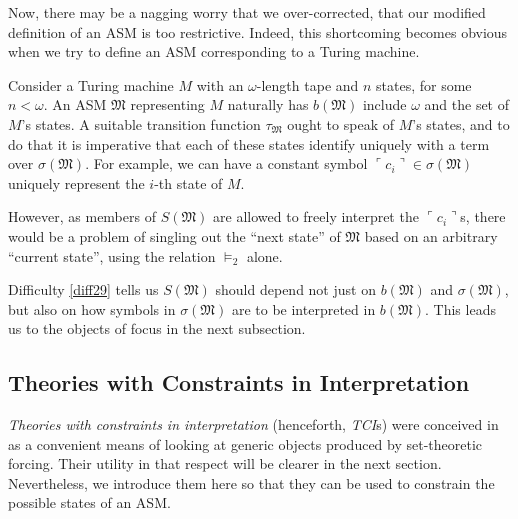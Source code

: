 \documentclass[12pt]{article}
\numberwithin{equation}{section}
\begin{document}
Now, there may be a nagging worry that we over-corrected, that our modified definition of an ASM is too restrictive. Indeed, this shortcoming becomes obvious when we try to define an ASM corresponding to a Turing machine.

\begin{diff}\label{diff29}
Consider a Turing machine $M$ with an $\omega$-length tape and $n$ states, for some $n < \omega$. An ASM $\mathfrak{M}$ representing $M$ naturally has $b(\mathfrak{M})$ include $\omega$ and the set of $M$'s states. A suitable transition function $\tau_{\mathfrak{M}}$ ought to speak of $M$'s states, and to do that it is imperative that each of these states identify uniquely with a term over $\sigma(\mathfrak{M})$. For example, we can have a constant symbol $\ulcorner c_i \urcorner \in \sigma(\mathfrak{M})$ uniquely represent the $i$-th state of $M$. 

However, as members of $S(\mathfrak{M})$ are allowed to freely interpret the $\ulcorner c_i \urcorner$s, there would be a problem of singling out the ``next state'' of $\mathfrak{M}$ based on an arbitrary ``current state'', using the relation $\models_2$ alone.
\end{diff}

Difficulty \ref{diff29} tells us $S(\mathfrak{M})$ should depend not just on $b(\mathfrak{M})$ and $\sigma(\mathfrak{M})$, but also on how symbols in $\sigma(\mathfrak{M})$ are to be interpreted in $b(\mathfrak{M})$. This leads us to the objects of focus in the next subsection.

\subsection{Theories with Constraints in Interpretation}\label{ssect23}

\emph{Theories with constraints in interpretation} (henceforth, \emph{TCI}s) were conceived in \cite{myself} as a convenient means of looking at generic objects produced by set-theoretic forcing. Their utility in that respect will be clearer in the next section. Nevertheless, we introduce them here so that they can be used to constrain the possible states of an ASM. 
\end{document}
